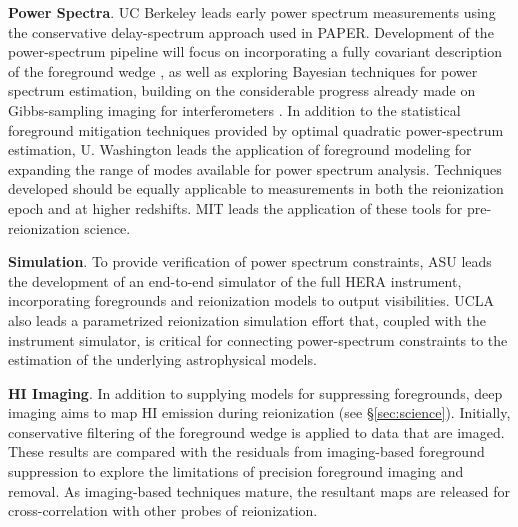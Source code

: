 \documentclass[ars]{/Users/daviddeboer1/Documents/Papers/Copernicus_LaTeX_Package_v_2_7/copernicus}
\begin{document}
{\bf Power Spectra}. UC Berkeley leads early power spectrum measurements using the conservative
delay-spectrum approach used in PAPER.  %
Development of
the power-spectrum pipeline will focus on incorporating
a fully covariant description of the foreground wedge
, as well as
exploring Bayesian techniques for power spectrum estimation, building on the considerable
progress already made on Gibbs-sampling imaging for interferometers .
In addition to the statistical foreground mitigation techniques provided by optimal quadratic
power-spectrum estimation, U. Washington leads the application of 
foreground modeling for expanding the range of modes available for power spectrum analysis.
Techniques developed should be equally applicable
to measurements in both the reionization epoch and at higher redshifts.  MIT leads the application
of these tools for pre-reionization science.

{\bf Simulation}. To provide verification of power spectrum constraints, ASU leads the
development of an end-to-end simulator of the full HERA instrument, incorporating
foregrounds and reionization models to output visibilities.  UCLA also leads
a parametrized reionization simulation effort that, coupled with the instrument
simulator, is critical for connecting power-spectrum constraints to the estimation
of the underlying astrophysical models.


{\bf HI Imaging}. In addition to supplying models for suppressing foregrounds,
deep imaging aims to map HI emission during reionization (see \S\ref{sec:science}).
Initially, conservative filtering of the foreground wedge is applied to data that
are imaged.  These results are compared with the residuals from imaging-based
foreground suppression to explore the limitations of 
precision foreground imaging and removal.  As imaging-based techniques mature, the resultant
maps are released for cross-correlation with other probes of reionization.

%
\end{document}
